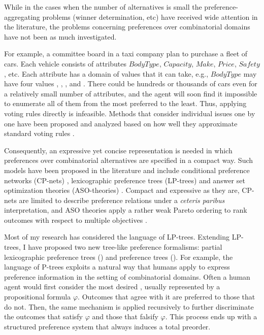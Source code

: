 While in the cases when the
number of alternatives is small the preference-aggregating problems (winner determination, 
etc) have received wide attention in the literature,
the problems concerning preferences over combinatorial
domains have not been as much investigated.

For example, a committee board in a taxi company plan to purchase a fleet of
cars.
Each vehicle consists of attributes $BodyType$, $Capacity$,
$Make$, $Price$, $Safety$, etc.  
Each attribute has a domain of values that it can take, e.g.,
$BodyType$ may have four values , , , and .
There could be hundreds or thousands of cars even for
a relatively small number of attributes, and
the agent will soon find it impossible to enumerate all of
them from the most preferred to the least.
Thus, applying voting rules directly is infeasible.
Methods that consider individual issues one by one have been proposed
and analyzed based on how well they approximate standard voting rules
\cite{fargier:ibi,Xia:SMV}.

Consequently, an expressive yet concise representation is needed in which
preferences over combinatorial alternatives are specified
in a compact way.
Such models have been proposed in the literature and include
conditional preference networks (CP-nets) \cite{Kaci:Pref}, 
lexicographic preference trees (LP-trees) \cite{booth:learningLP} and
answer set optimization theories (ASO-theories) \cite{Brewka:ASO,Brewka04}.
Compact and expressive as they are, CP-nets are limited
to describe preference relations under a 
\textit{ceteris paribus} interpretation, and
ASO theories apply a rather weak Pareto ordering
to rank outcomes with respect to multiple objectives \cite{Brewka:ASO}.

Most of my research has considered the language of LP-trees.
Extending LP-trees, I have proposed two new tree-like preference formalisms:
partial lexicographic preference trees ()\cite{conf/aaai15/LiuT}
and preference trees ()\cite{fraser1994,liu2014preference,conf/adt15/liuT}.
For example, the language of P-trees exploits a natural way that humans apply to
express preference information in the setting of combinatorial domains.
Often a human agent would first consider the most desired ,
usually represented by a propositional formula $\varphi$.
Outcomes that agree with it are preferred to those that do not.  
Then, the same mechanism is applied recursively to further discriminate the 
outcomes that satisfy $\varphi$ and those that falsify $\varphi$.
This process ends up with a structured preference system that always
induces a total preorder.

